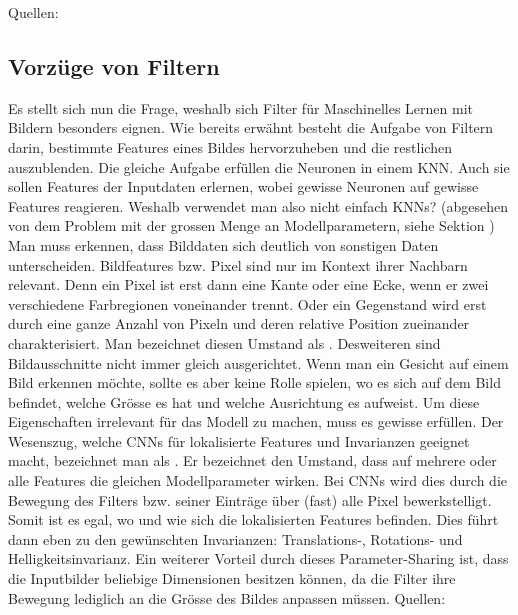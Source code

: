 Quellen: \cite{deeplearning.ai:cnn}

\subsection{Vorzüge von Filtern}
Es stellt sich nun die Frage, weshalb sich Filter für Maschinelles
Lernen mit Bildern besonders eignen.
Wie bereits erwähnt besteht die Aufgabe von Filtern darin, bestimmte Features
eines Bildes hervorzuheben und die restlichen auszublenden. Die gleiche
Aufgabe erfüllen die Neuronen in einem KNN. Auch sie sollen Features der
Inputdaten erlernen, wobei gewisse Neuronen auf gewisse Features reagieren.
Weshalb verwendet man also nicht einfach KNNs? (abgesehen
von dem Problem mit der grossen Menge an Modellparametern, siehe Sektion )
\para{}
Man muss erkennen, dass Bilddaten sich deutlich von sonstigen Daten unterscheiden.
Bildfeatures bzw. Pixel sind nur im Kontext ihrer Nachbarn relevant. Denn
ein Pixel ist erst dann eine Kante oder eine Ecke, wenn er zwei verschiedene
Farbregionen voneinander trennt. Oder ein Gegenstand wird erst durch eine ganze Anzahl
von Pixeln und deren relative Position zueinander charakterisiert.
Man bezeichnet diesen Umstand als .
\para{}
Desweiteren sind Bildausschnitte nicht immer gleich
ausgerichtet. Wenn man ein Gesicht auf einem Bild erkennen möchte, sollte es aber
keine Rolle spielen, wo es sich auf dem Bild befindet, welche Grösse es
hat und welche Ausrichtung es aufweist. Um diese Eigenschaften irrelevant für das
Modell zu machen, muss es gewisse  erfüllen.
\para{}
Der Wesenszug, welche CNNs für lokalisierte Features und
Invarianzen geeignet macht, bezeichnet man als .
Er bezeichnet den Umstand, dass auf
mehrere oder alle Features die gleichen Modellparameter wirken. Bei CNNs wird
dies durch die Bewegung des Filters bzw. seiner Einträge über (fast) alle
Pixel bewerkstelligt. Somit ist
es egal, wo und wie sich die lokalisierten Features befinden. Dies führt dann eben zu
den gewünschten Invarianzen: Translations-, Rotations- und
Helligkeitsinvarianz.
\para{}
Ein weiterer Vorteil durch dieses Parameter-Sharing ist, dass die Inputbilder
beliebige Dimensionen besitzen können, da die Filter ihre Bewegung lediglich an
die Grösse des Bildes anpassen müssen.
\para{}
Quellen: \cite{deeplearning.ai:cnn}

